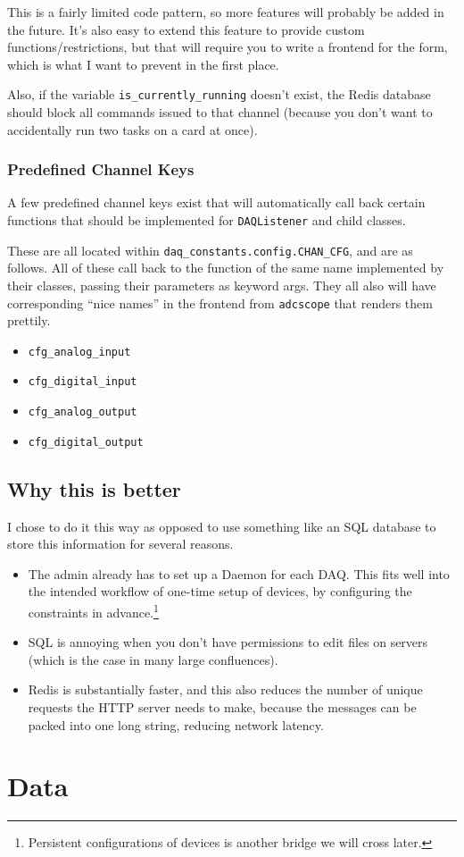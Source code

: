 \documentclass{article}
\begin{document}
This is a fairly limited code pattern, so more features will probably be added in the future. It's also easy to extend this feature to provide custom functions/restrictions, but that will require you to write a frontend for the form, which is what I want to prevent in the first place.

Also, if the variable \texttt{is\_currently\_running} doesn't exist, the Redis database should block all commands issued to that channel (because you don't want to accidentally run two tasks on a card at once).

\subsubsection{Predefined Channel Keys}
A few predefined channel keys exist that will automatically call back certain functions that should be implemented for \texttt{DAQListener} and child classes.

These are all located within \texttt{daq\_constants.config.CHAN\_CFG}, and are as follows.
All of these call back to the function of the same name implemented by their classes, passing their parameters as keyword args.
They all also will have corresponding ``nice names'' in the frontend from \texttt{adcscope} that renders them prettily.
\begin{itemize}
	\item \texttt{cfg\_analog\_input}
	\item \texttt{cfg\_digital\_input}
	\item \texttt{cfg\_analog\_output}
	\item \texttt{cfg\_digital\_output}
\end{itemize}

\subsection{Why this is better}
I chose to do it this way as opposed to use something like an SQL database to store this information for several reasons.
\begin{itemize}
	\item The admin already has to set up a Daemon for each DAQ. This fits well into the intended workflow of one-time setup of devices, by configuring the constraints in advance.\footnote{Persistent configurations of devices is another bridge we will cross later.}
			\item SQL is annoying when you don't have permissions to edit files on servers (which is the case in many large confluences).
			\item Redis is substantially faster, and this also reduces the number of unique requests the HTTP server needs to make, because the messages can be packed into one long string, reducing network latency.
\end{itemize}

\section{Data}
\end{document}
